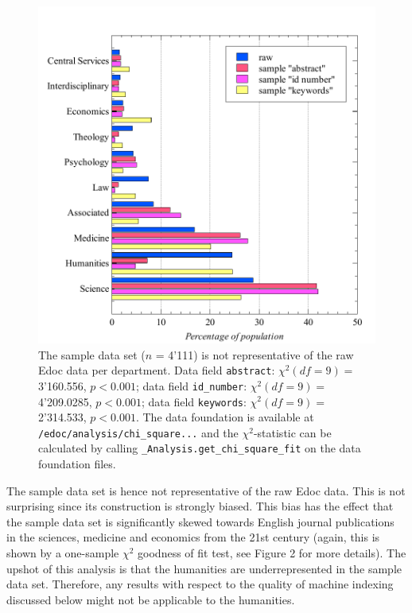 \begin{figure}
\centering
\includegraphics{images/chi_square_selection_fields.pdf}
\caption{The sample data set (\(n\) = 4'111) is not representative of
the raw Edoc data per department. Data field \texttt{abstract}:
\(\chi^2 (df=9) =\) 3'160.556, \(p < 0.001\); data field
\texttt{id\_number}: \(\chi^2 (df=9) =\) 4'209.0285, \(p < 0.001\); data
field \texttt{keywords}: \(\chi^2 (df=9) =\) 2'314.533, \(p < 0.001\).
The data foundation is available at
\texttt{/edoc/analysis/chi\_square...} and the \(\chi^2\)-statistic can
be calculated by calling \texttt{\_Analysis.get\_chi\_square\_fit} on
the data foundation files.}
\end{figure}

The sample data set is hence not representative of the raw Edoc data.
This is not surprising since its construction is strongly biased. This
bias has the effect that the sample data set is significantly skewed
towards English journal publications in the sciences, medicine and
economics from the 21st century (again, this is shown by a one-sample
\(\chi^2\) goodness of fit test, see Figure 2 for more details). The
upshot of this analysis is that the humanities are underrepresented in
the sample data set. Therefore, any results with respect to the quality
of machine indexing discussed below might not be applicable to the
humanities.

